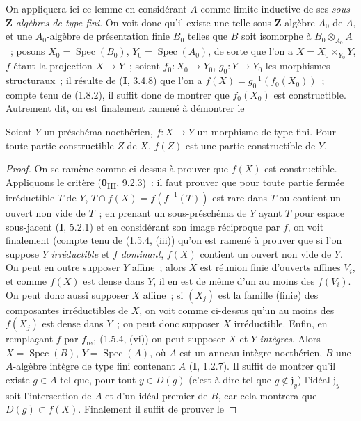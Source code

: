 On appliquera ici ce lemme en considérant $A$ comme limite inductive de ses
\emph{sous-$\mathbf Z$-algèbres de type fini}. On voit donc qu'il existe une
telle sous-$\mathbf Z$-algèbre $A_0$ de $A$, et une $A_0$-algèbre de
présentation finie $B_0$ telles que $B$ soit isomorphe à
$B_0\otimes_{A_0}A$~; posons $X_0=\operatorname{Spec}(B_0)$,
$Y_0=\operatorname{Spec}(A_0)$, de sorte que l'on a $X=X_0\times_{Y_0}Y$,
$f$ étant la projection $X\to Y$~; soient $f_0:X_0\to Y_0$,
$g_0:Y\to Y_0$ les morphismes structuraux~; il résulte de (\textbf{I}, 3.4.8) que
l'on a $f(X)=g_0^{-1}(f_0(X_0))$~; compte tenu de (1.8.2), il suffit donc de
montrer que $f_0(X_0)$ est constructible. Autrement dit, on est finalement
ramené à démontrer le

\begin{corollary}[1.8.5]
\label{IV.1.8.5-fr}
Soient $Y$ un préschéma noethérien, $f:X\to Y$ un morphisme de type fini.
Pour toute partie constructible $Z$ de $X$, $f(Z)$ est une partie
constructible de $Y$.
\end{corollary}


\begin{proof}
On se ramène comme ci-dessus à prouver que $f(X)$ est constructible.
Appliquons le critère (\textbf{0}\textsubscript{III}, 9.2.3)~: il faut prouver que pour
toute partie fermée irréductible $T$ de $Y$, $T\cap f(X)=f(f^{-1}(T))$ est
rare dans $T$ ou contient un ouvert non vide de $T$~; en prenant un
sous-préschéma de $Y$ ayant $T$ pour espace sous-jacent (\textbf{I}, 5.2.1) et en
considérant son image réciproque par $f$, on voit finalement (compte tenu de
(1.5.4, (iii)) qu'on est ramené à prouver que si l'on suppose $Y$
\emph{irréductible} et $f$ \emph{dominant}, $f(X)$ contient un ouvert non vide de
$Y$. On peut en outre supposer $Y$ affine~; alors $X$ est réunion finie
d'ouverts affines $V_i$, et comme $f(X)$ est dense dans $Y$, il en est de
même d'un au moins des $f(V_i)$. On peut donc aussi supposer $X$ affine~; si
$(X_j)$ est la famille (finie) des composantes irréductibles de $X$, on voit
comme ci-dessus qu'un au moins des $f(X_j)$ est dense dans $Y$~; on peut donc
supposer $X$ irréductible. Enfin, en remplaçant $f$ par $f_{\mathrm{red}}$
(1.5.4, (vi)) on peut supposer $X$ et $Y$ \emph{intègres}. Alors
$X=\operatorname{Spec}(B)$, $Y=\operatorname{Spec}(A)$, où $A$ est un
anneau intègre noethérien, $B$ une $A$-algèbre intègre de type fini contenant
$A$ (\textbf{I}, 1.2.7). Il suffit de montrer qu'il existe $g\in A$ tel que, pour tout
$y\in D(g)$ (c'est-à-dire tel que $g\notin\mathfrak j_y$) l'idéal
$\mathfrak j_y$ soit l'intersection de $A$ et d'un idéal premier de $B$, car
cela montrera que $D(g)\subset f(X)$. Finalement il suffit de prouver le
\end{proof}

